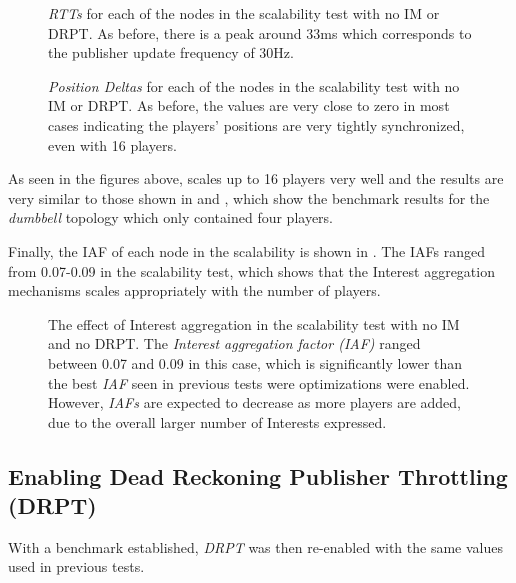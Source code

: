 \begin{figure}[H]
    \centering
    \caption{\textit{RTTs} for each of the nodes in the scalability test with no IM or DRPT. As before, there is a peak around 33ms which corresponds to the publisher update frequency of 30Hz.}
    \label{fig:eval:no-im-no-dr:agg-packet-times}
\end{figure}

\begin{figure}[H]
    \centering
    \caption{\textit{Position Deltas} for each of the nodes in the scalability test with no IM or DRPT. As before, the values are very close to zero in most cases indicating the players' positions are very tightly synchronized, even with 16 players.}
    \label{fig:eval:no-im-no-dr:agg-pos-deltas}
\end{figure}

As seen in the figures above, \game{} scales up to 16 players very well and the results are very similar to those shown in  and , which show the benchmark results for the \textit{dumbbell} topology which only contained four players. 

Finally, the IAF of each node in the scalability is shown in . The IAFs ranged from 0.07-0.09 in the scalability test, which shows that the Interest aggregation mechanisms scales appropriately with the number of players. 

\begin{figure}[H]
    \centering
    \caption{The effect of Interest aggregation in the scalability test with no IM and no DRPT. The \textit{Interest aggregation factor (IAF)} ranged between 0.07 and 0.09 in this case, which is significantly lower than the best \textit{IAF} seen in previous tests were optimizations were enabled. However, \textit{IAFs} are expected to decrease as more players are added, due to the overall larger number of Interests expressed.}
    \label{fig:eval:no-im-no-dr:int-agg}
\end{figure}



\subsection{Enabling Dead Reckoning Publisher Throttling (DRPT)}
With a benchmark established, \textit{DRPT} was then re-enabled with the same values used in previous tests. 

